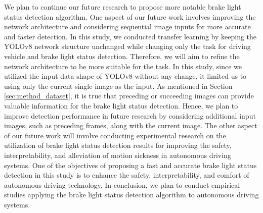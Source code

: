 We plan to continue our future research to propose more notable brake light status detection algorithm.
One aspect of our future work involves improving the network architecture and considering sequential image inputs for more accurate and faster detection.
In this study, we conducted transfer learning by keeping the YOLOv8 network structure unchanged while changing only the task for driving vehicle and brake light status detection.
Therefore, we will aim to refine the network architecture to be more suitable for the task.
In this study, since we utilized the input data shape of YOLOv8 without any change, it limited us to using only the current single image as the input. 
As mentioned in Section \ref{sec:method_dataset}, it is true that preceding or succeeding images can provide valuable information for the brake light status detection.
Hence, we plan to improve detection performance in future research by considering additional input images, such as preceding frames, along with the current image.
The other aspect of our future work will involve conducting experimental research on the utilization of brake light status detection results for improving the safety, interpretability, and alleviation of motion sickness in autonomous driving systems.
One of the objectives of proposing a fast and accurate brake light status detection in this study is to enhance the safety, interpretability, and comfort of autonomous driving technology.
In conclusion, we plan to conduct empirical studies applying the brake light status detection algorithm to autonomous driving systems.